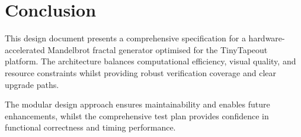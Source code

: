 \documentclass[11pt,a4paper]{article}
\begin{document}
\section{Conclusion}
This design document presents a comprehensive specification for a hardware-accelerated Mandelbrot fractal generator optimised for the TinyTapeout platform. The architecture balances computational efficiency, visual quality, and resource constraints whilst providing robust verification coverage and clear upgrade paths.

The modular design approach ensures maintainability and enables future enhancements, whilst the comprehensive test plan provides confidence in functional correctness and timing performance.
\end{document}
